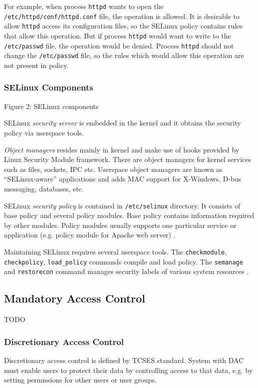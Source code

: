 For example, when process \texttt{httpd} wants to open the
\texttt{/etc/httpd/conf/httpd.conf} file, the operation is allowed. It is
desirable to allow \texttt{httpd} access its configuration files, so the SELinux
policy contains rules that allow this operation. But if process \texttt{httpd}
would want to write to the \texttt{/etc/passwd} file, the operation would be
denied. Process \texttt{httpd} should not change the \texttt{/etc/passwd} file,
so the rules which would allow this operation are not present in policy.

\subsubsection{SELinux Components}
Figure 2: SELinux components

SELinux \emph{security server} is embedded in the kernel and it obtains the
security policy via userspace tools.

\emph{Object managers} resides mainly in kernel and make use of hooks provided
by Linux Security Module framework. There are object managers for kernel
services such as files, sockets, IPC etc. Userspace object managers are known as
``SELinux-aware'' applications and adds MAC support for X-Windows, D-bus
messaging, databases, etc.

SELinux \emph{security policy} is contained in \texttt{/etc/selinux} directory.
It consists of base policy and several policy modules. Base policy contains
information required by other modules. Policy modules usually supports one
particular service or application (e.g. policy module for Apache web server)
\cite[pp.~20--22]{tsn}.

Maintaining SELinux requires several userspace tools. The \texttt{checkmodule},
\texttt{checkpolicy}, \texttt{load\_policy} commands compile and load policy.
The \texttt{semanage} and \texttt{restorecon} command manages security labels of
various system resources \cite[p.~389]{tsn}.


\subsection{Mandatory Access Control}

TODO

\subsubsection{Discretionary Access Control}
Discretionary access control is defined by TCSES standard. System with DAC must
enable users to protect their data by controlling access to that data, e.g. by
setting permissions for other users or user groups.


